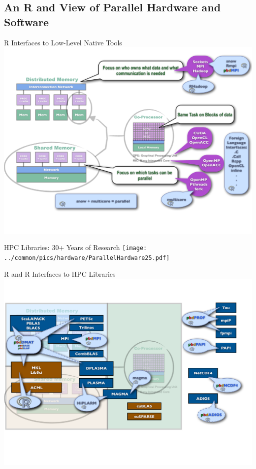 \subsection{An R and \protect\pbdR View of Parallel Hardware and Software}
\makesubcontentsslidessec

\begin{frame}{R Interfaces to Low-Level Native Tools}
\includegraphics[height=\textheight]
{../common/pics/hardware/ParallelHardware10.pdf}
\end{frame}

\begin{frame}{HPC Libraries: 30+ Years of Research}
\texttt{[image: ../common/pics/hardware/ParallelHardware25.pdf]}
\end{frame}

\begin{frame}{R and \pbdR R Interfaces to HPC Libraries}
\includegraphics[height=\textheight]
{../common/pics/hardware/ParallelHardware26.pdf}
\end{frame}

